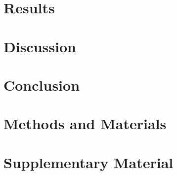 \documentclass[12pt]{article}
\begin{document}
\newpage
\section{Results}
\label{sec:results}


\newpage
\section{Discussion}
\label{sec:discussion}


\section{Conclusion}
\label{sec:conclusion}


\newpage
\section{Methods and Materials}
\label{sec:methods}


\newpage
\RaggedRight



\newpage
\appendix
\section{Supplementary Material}
\label{sec:supplementary}

\end{document}
